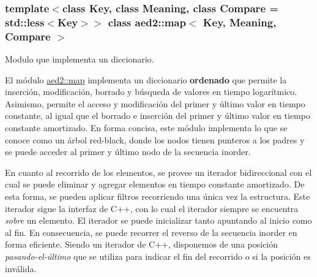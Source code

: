 \subsubsection*{template$<$class Key, class Meaning, class Compare = std\+::less$<$\+Key$>$$>$\newline
class aed2\+::map$<$ Key, Meaning, Compare $>$}

Modulo que implementa un diccionario. 

El módulo \hyperlink{classaed2_1_1map}{aed2\+::map} implementa un diccionario {\bfseries ordenado} que permite la inserción, modificación, borrado y búsqueda de valores en tiempo logarítmico. Asimismo, permite el acceso y modificación del primer y último valor en tiempo constante, al igual que el borrado e inserción del primer y último valor en tiempo constante amortizado. En forma concisa, este módulo implementa lo que se conoce como un árbol red-\/black, donde los nodos tienen punteros a los padres y se puede acceder al primer y último nodo de la secuencia inorder.

En cuanto al recorrido de los elementos, se provee un iterador bidireccional con el cual se puede eliminar y agregar elementos en tiempo constante amortizado. De esta forma, se pueden aplicar filtros recorriendo una única vez la estructura. Este iterador sigue la interfaz de C++, con lo cual el iterador siempre se encuentra {\itshape sobre} un elemento. El iterador se puede inicializar tanto apuntando al inicio como al fin. En consecuencia, se puede recorrer el reverso de la secuencia inorder en forma eficiente. Siendo un iterador de C++, disponemos de una posición {\itshape pasando-\/el-\/último} que se utiliza para indicar el fin del recorrido o si la posición es inválida.



